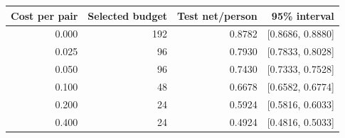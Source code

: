 \begin{tabular}{rrrr}\toprule
Cost per pair & Selected budget & Test net/person & 95\% interval \\\midrule
0.000 & 192 & 0.8782 & [0.8686, 0.8880] \\
0.025 & 96 & 0.7930 & [0.7833, 0.8028] \\
0.050 & 96 & 0.7430 & [0.7333, 0.7528] \\
0.100 & 48 & 0.6678 & [0.6582, 0.6774] \\
0.200 & 24 & 0.5924 & [0.5816, 0.6033] \\
0.400 & 24 & 0.4924 & [0.4816, 0.5033] \\
\bottomrule\end{tabular}
